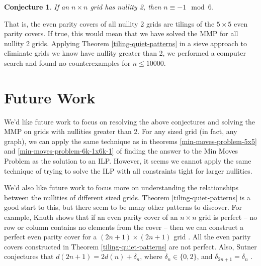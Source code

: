 \documentclass[a4paper]{article}
\newtheorem{conjecture}{Conjecture}
\begin{document}
	\begin{conjecture}\label{all-nullity2-conj}
		If an $n \times n$ grid has nullity 2, then $n \equiv -1 \mod 6$.
	\end{conjecture}
	That is, the even parity covers of all nullity 2 grids are tilings of the $5 \times 5$ even parity covers.
	If true, this would mean that we have solved the MMP for all nullity 2 grids.
	Applying Theorem \ref{tiling-quiet-patterns} in a sieve approach to eliminate grids we know have nullity greater than 2, we performed a computer search and found no counterexamples for $n \leq 10000$.
	
	\section{Future Work}
	We'd like future work to focus on resolving the above conjectures and solving the MMP on grids with nullities greater than 2.
	For any sized grid (in fact, any graph), we can apply the same technique as in theorems \ref{min-moves-problem-5x5} and \ref{min-moves-problem-6k-1x6k-1} of finding the answer to the Min Moves Problem as the solution to an ILP.
	However, it seems we cannot apply the same technique of trying to solve the ILP with all constraints tight for larger nullities.
	
	We'd also like future work to focus more on understanding the relationships between the nullities of different sized grids.
	Theorem \ref{tiling-quiet-patterns} is a good start to this, but there seem to be many other patterns to discover.
	For example, Knuth shows that if an even parity cover of an $n \times n$ grid is perfect -- no row or column contains no elements from the cover -- then we can construct a perfect even parity cover for a $(2n+1) \times (2n+1)$ grid \cite{Knuth_AOCP4A}.
	All the even parity covers constructed in Theorem \ref{tiling-quiet-patterns} are not perfect.
	Also, Sutner conjectures that $d(2n+1) = 2d(n) + \delta_n$, where $\delta_n \in \{0,2\}$, and $\delta_{2n+1} = \delta_n$ \cite{Sutner1989}.
	
	\newpage
	
	
\end{document}
